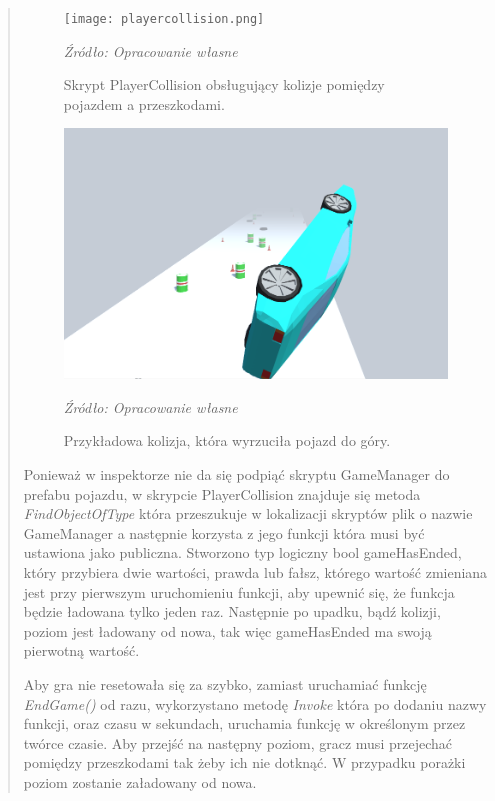\begin{quotation}
\begin{figure}[!hbt]
\centering
  \texttt{[image: playercollision.png]}
  \caption{Skrypt PlayerCollision obsługujący kolizje pomiędzy pojazdem a przeszkodami.}\label{rys_24}
  \begin{minipage}[t]{0.75\linewidth}
    \emph{Źródło: Opracowanie własne}
  \end{minipage}
\end{figure}

\newpage
\begin{figure}[!hbt]
\centering
  \includegraphics[width=1\linewidth]{kolizja1.png}
  \caption{Przykładowa kolizja, która wyrzuciła pojazd do góry.}\label{rys_25}
  \begin{minipage}[t]{0.75\linewidth}
    \emph{Źródło: Opracowanie własne}
  \end{minipage}
\end{figure}

\indent Ponieważ w inspektorze nie da się podpiąć skryptu GameManager do prefabu pojazdu, w skrypcie PlayerCollision znajduje się metoda \textit{FindObjectOfType} która przeszukuje w lokalizacji skryptów plik o nazwie GameManager a następnie korzysta z jego funkcji która musi być ustawiona jako publiczna. Stworzono typ logiczny bool gameHasEnded, który przybiera dwie wartości, prawda lub fałsz, którego wartość zmieniana jest przy pierwszym uruchomieniu funkcji, aby upewnić się, że funkcja będzie ładowana tylko jeden raz. Następnie po upadku, bądź kolizji, poziom jest ładowany od nowa, tak więc gameHasEnded ma swoją pierwotną wartość. 

\newpage
\indent Aby gra nie resetowała się za szybko, zamiast uruchamiać funkcję \textit{EndGame()} od razu, wykorzystano metodę \textit{Invoke} która po dodaniu nazwy funkcji, oraz czasu w sekundach, uruchamia funkcję w określonym przez twórce czasie. Aby przejść na następny poziom, gracz musi przejechać pomiędzy przeszkodami tak żeby ich nie dotknąć. W przypadku porażki poziom zostanie załadowany od nowa.


\end{quotation}
